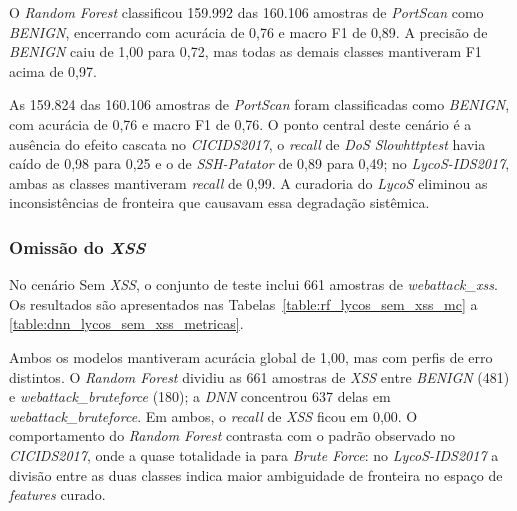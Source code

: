 

O \textit{Random Forest} classificou 159.992 das 160.106 amostras de \textit{PortScan} como \textit{BENIGN}, encerrando com acurácia de 0,76 e macro F1 de 0,89. A precisão de \textit{BENIGN} caiu de 1,00 para 0,72, mas todas as demais classes mantiveram F1 acima de 0,97.

As 159.824 das 160.106 amostras de \textit{PortScan} foram classificadas como \textit{BENIGN}, com acurácia de 0,76 e macro F1 de 0,76. O ponto central deste cenário é a ausência do efeito cascata no \textit{CICIDS2017}, o \textit{recall} de \textit{DoS Slowhttptest} havia caído de 0,98 para 0,25 e o de \textit{SSH-Patator} de 0,89 para 0,49; no \textit{LycoS-IDS2017}, ambas as classes mantiveram \textit{recall} de 0,99. A curadoria do \textit{LycoS} eliminou as inconsistências de fronteira que causavam essa degradação sistêmica.

\subsubsection{Omissão do \textit{XSS}}

No cenário Sem \textit{XSS}, o conjunto de teste inclui 661 amostras de \textit{webattack\_xss}. Os resultados são apresentados nas Tabelas~\ref{table:rf_lycos_sem_xss_mc} a \ref{table:dnn_lycos_sem_xss_metricas}.









Ambos os modelos mantiveram acurácia global de 1,00, mas com perfis de erro distintos. O \textit{Random Forest} dividiu as 661 amostras de \textit{XSS} entre \textit{BENIGN} (481) e \textit{webattack\_bruteforce} (180); a \textit{DNN} concentrou 637 delas em \textit{webattack\_bruteforce}. Em ambos, o \textit{recall} de \textit{XSS} ficou em 0,00. O comportamento do \textit{Random Forest} contrasta com o padrão observado no \textit{CICIDS2017}, onde a quase totalidade ia para \textit{Brute Force}: no \textit{LycoS-IDS2017} a divisão entre as duas classes indica maior ambiguidade de fronteira no espaço de \textit{features} curado.

